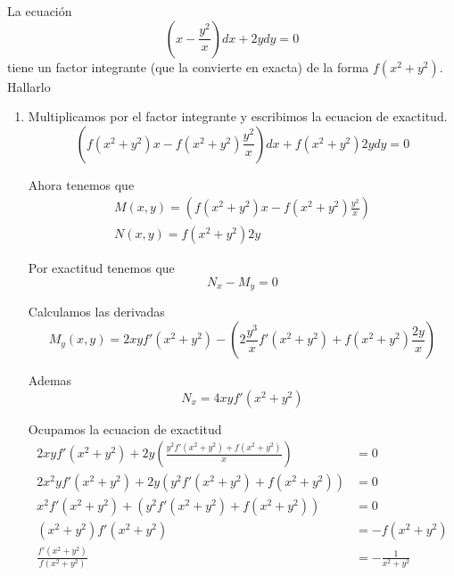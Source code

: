 \documentclass[a4paper,oneside,10.5pt]{article}
\begin{document}
\begin{ejemplo}
  La ecuaci\'on
  \begin{equation*}
    (x - \frac{y^{2}}{x}) d x+ 2y dy = 0
  \end{equation*}
  tiene un factor integrante (que la convierte en exacta) de la forma $f(x^{2} + y^{2})$. Hallarlo
  \begin{enumerate}
    \item Multiplicamos por el factor integrante y escribimos la ecuacion de exactitud.
          \begin{equation*}
            (f(x^{2} + y^{2})x - f(x^{2} + y^{2})\frac{y^{2}}{x}) dx + f(x^{2} + y^{2}) 2y dy = 0
          \end{equation*}

          Ahora tenemos que
          \begin{gather*}
            M(x, y) = (f(x^{2} + y^{2})x - f(x^{2} + y^{2})\frac{y^{2}}{x})\\
            N(x, y) = f(x^{2} + y^{2}) 2y
          \end{gather*}

          Por exactitud tenemos que
          \begin{equation*}
            N_{x} - M_{y} = 0
          \end{equation*}

          Calculamos las derivadas
          \begin{equation*}
            M_{y}(x, y) =  2xyf'(x^{2} + y^{2}) - (2\frac{y^{3}}{x} f'(x^{2} + y^{2}) + f(x^{2} + y^{2}) \frac{2y}{x})
          \end{equation*}

          Ademas
          \begin{equation*}
            N_{x} = 4xyf'(x^{2} + y^{2})
          \end{equation*}

          Ocupamos la ecuacion de exactitud
          \begin{align*}
            2xyf'(x^{2} + y^{2}) + 2y(\frac{y^{2}f'(x^{2} + y^{2}) + f(x^{2} + y^{2})}{x}) &= 0\\
            2x^{2}yf'(x^{2} + y^{2}) + 2y(y^{2}f'(x^{2} + y^{2}) + f(x^{2} + y^{2})) &= 0\\
            x^{2}f'(x^{2} + y^{2}) + (y^{2}f'(x^{2} + y^{2}) + f(x^{2} + y^{2})) &= 0\\
            (x^{2} + y^{2})f'(x^{2} + y^{2}) &= -f(x^{2} + y^{2})\\
            \frac{f'(x^{2} + y^{2})}{f(x^{2} + y^{2})} &= -\frac{1}{x^{2} + y^{2}}
          \end{align*}


\end{enumerate}
\end{ejemplo}
\end{document}
